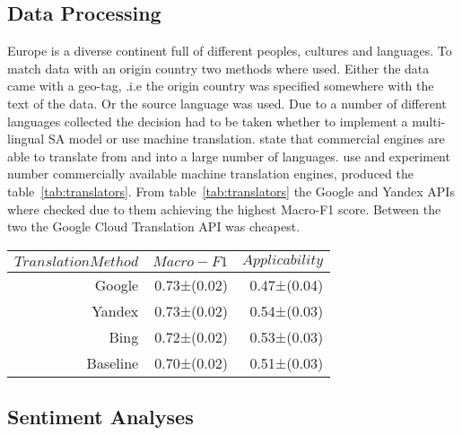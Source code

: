 
\subsection{Data Processing}

Europe is a diverse continent full of different peoples, cultures and languages.
To match data with an origin country two methods where used.
Either the data came with a geo-tag, .i.e the origin country was specified somewhere with the text of the data.
Or the source language was used.
Due to a number of different languages collected the decision had to be taken whether to implement a multi-lingual \ac{SA} model or use machine translation.
\citet{Balahur2014} state that commercial engines are able to translate from and into a large number of languages.
\citet{Arajo2020} use and experiment number commercially available machine translation engines, produced the table~\ref{tab:translators}.
From table~\ref{tab:translators} the Google and Yandex \ac{API}s where checked due to them achieving the highest Macro-F1 score.
Between the two the Google Cloud Translation \ac{API} was cheapest.

\begin{table*}[ht!]\centering
{}
\begin{tabular}{rrr}\toprule
$Translation Method$ & $Macro-F1$ & $Applicability$\\ \midrule
Google& 0.73±(0.02)& 0.47±(0.04)&\\
Yandex& 0.73±(0.02)& 0.54±(0.03)&\\
Bing& 0.72±(0.02)& 0.53±(0.03)&\\
Baseline& 0.70±(0.02)& 0.51±(0.03)&\\
\bottomrule
\end{tabular}
\caption[Macro-F1 and Applicability mean () results on different Translation Methods]{Macro-F1 and Applicability mean () results given each machine translation system among all language datasets when translated to English.}\label{tab:translators}
\end{table*}

\subsection{Sentiment Analyses}

